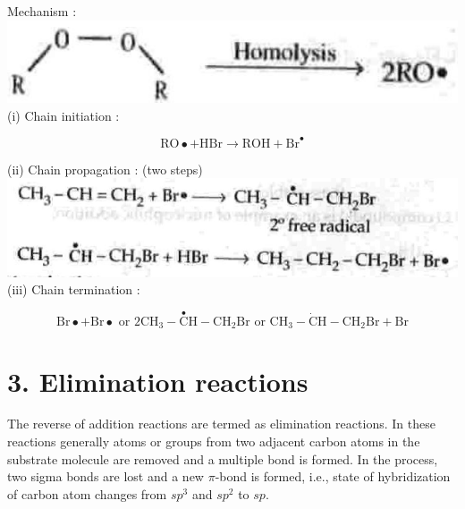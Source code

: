 \documentclass[10pt]{article}
\begin{document}
Mechanism :\\
\includegraphics[max width=\textwidth, center]{2025_01_28_8470952b98110cec3aabg-098}\\
(i) Chain initiation :

$$
\mathrm{RO} \bullet+\mathrm{HBr} \longrightarrow \mathrm{ROH}+\mathrm{Br}^{\bullet}
$$

(ii) Chain propagation : (two steps)\\
\includegraphics[max width=\textwidth, center]{2025_01_28_8470952b98110cec3aabg-098(3)}\\
(iii) Chain termination :

$$
\mathrm{Br} \bullet+\mathrm{Br} \bullet \text { or } 2 \mathrm{CH}_{3}-\stackrel{\bullet}{\mathrm{C}} \mathrm{H}-\mathrm{CH}_{2} \mathrm{Br} \text { or } \mathrm{CH}_{3}-\dot{\mathrm{C}} \mathrm{H}-\mathrm{CH}_{2} \mathrm{Br}+\mathrm{Br}
$$

\section*{3. Elimination reactions}
The reverse of addition reactions are termed as elimination reactions. In these reactions generally atoms or groups from two adjacent carbon atoms in the substrate molecule are removed and a multiple bond is formed. In the process, two sigma bonds are lost and a new $\pi$-bond is formed, i.e., state of hybridization of carbon atom changes from $s p^{3}$ and $s p^{2}$ to $s p$.
\end{document}
